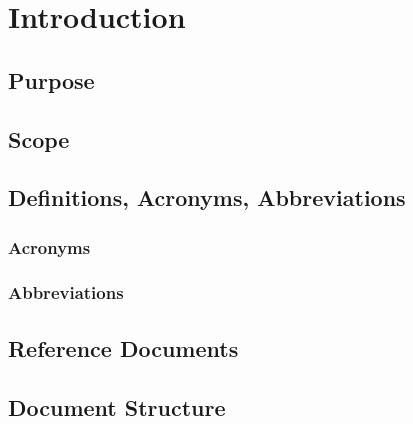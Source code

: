 \break
\section{Introduction}
\subsection{Purpose}
\subsection{Scope}
\subsection{Definitions, Acronyms, Abbreviations}
\subsubsection{Acronyms}
\subsubsection{Abbreviations}
\subsection{Reference Documents}
\subsection{Document Structure}
